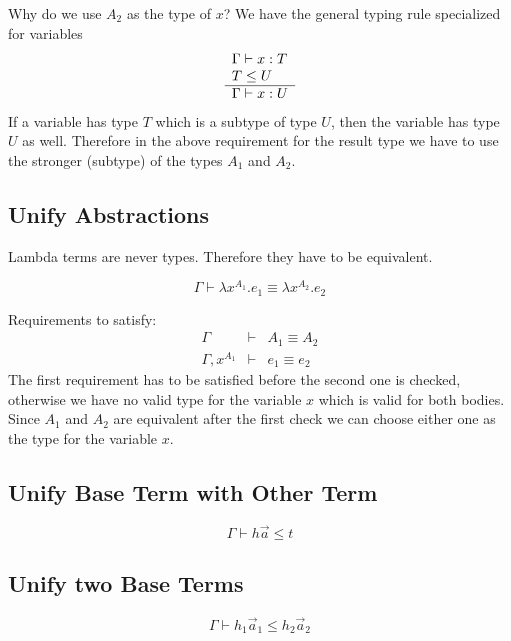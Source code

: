 Why do we use $A_2$ as the type of $x$? We have the general typing rule
specialized for variables
$$
    \begin{array}{l} 
        \Gamma \vdash x : T
        \\
        T \le U
     \\ \hline 
        \Gamma \vdash x: U
     \end{array}
$$
If a variable has type $T$ which is a subtype of type $U$, then the variable has
type $U$ as well. Therefore in the above requirement for the result type we have
to use the stronger (subtype) of the types $A_1$ and $A_2$.






\subsection{Unify Abstractions}

Lambda terms are never types. Therefore they have to be equivalent.

$$
    \Gamma \vdash \lambda x^{A_1}. e_1 \equiv \lambda x^{A_2}. e_2
$$

Requirements to satisfy:
$$
\begin{array}{lll}
    \Gamma &\vdash&
    A_1 \equiv A_2
    \\
    \Gamma, x^{A_1} &\vdash&
    e_1 \equiv e_2
\end{array}
$$
The first requirement has to be satisfied before the second one is checked,
otherwise we have no valid type for the variable $x$ which is valid for both
bodies. Since $A_1$ and $A_2$ are equivalent after the first check we can choose
either one as the type for the variable $x$.






\subsection{Unify Base Term with Other Term}


$$
    \Gamma \vdash h \vec a \le t
$$




\subsection{Unify two Base Terms}


$$
    \Gamma \vdash h_1 \vec a_1 \le h_2 \vec a_2
$$
